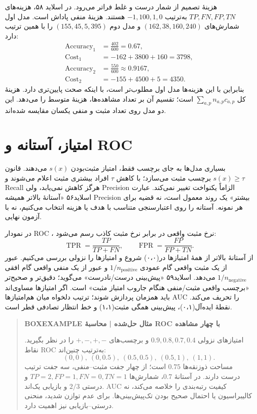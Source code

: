 هزینهٔ تصمیم از شمار درست و غلط فراتر می‌رود. در اسلاید ۵۸، هزینه‌های $TP,FN,FP,TN$ به‌ترتیب $-1,100,1,0$ هستند. هزینهٔ منفی پاداش است. مدل اول شمارش‌های $(162,38,160,240)$ و مدل دوم $(155,45,5,395)$ را با همین ترتیب دارد:
\begin{align*}
\operatorname{Accuracy}_1&=\frac{402}{600}=0.67,\\
\operatorname{Cost}_1&=-162+3800+160=3798,\\
\operatorname{Accuracy}_2&=\frac{550}{600}\approx0.9167,\\
\operatorname{Cost}_2&=-155+4500+5=4350.
\end{align*}
بنابراین با این هزینه‌ها مدل اول مطلوب‌تر است، با اینکه صحت پایین‌تری دارد. هزینهٔ کل $\sum_{a,p}n_{a,p}c_{a,p}$ است؛ تقسیم آن بر تعداد مشاهده‌ها، هزینهٔ متوسط را می‌دهد. این دو مدل روی تعداد مثبت و منفی یکسان مقایسه شده‌اند.

\section{امتیاز، آستانه و ROC}

بسیاری مدل‌ها به جای برچسب فقط، امتیاز مثبت‌بودن $s(x)$ می‌دهند. قانون $s(x)\ge\tau$ برچسب مثبت می‌سازد؛ با کاهش $\tau$ افراد بیشتری مثبت اعلام می‌شوند و Recall هرگز کاهش نمی‌یابد، ولی Precision الزاماً یکنواخت تغییر نمی‌کند. عبارت اسلاید۵۶ «آستانهٔ بالاتر همیشه Precision بیشتر» یک روند معمول است، نه قضیه برای هر نمونه. آستانه را روی اعتبارسنجی متناسب با هدف یا هزینه انتخاب می‌کنیم، نه با آزمون نهایی.

در نمودار ROC ، نرخ مثبت واقعی در برابر نرخ مثبت کاذب رسم می‌شود:\[\operatorname{TPR}=\frac{TP}{TP+FN},\qquad\operatorname{FPR}=\frac{FP}{FP+TN}.\] از آستانهٔ بالاتر از همهٔ امتیازها در(۰،۰) شروع و امتیازها را نزولی بررسی می‌کنیم. عبور از یک مثبت واقعی گام عمودی $1/n_{\mathrm{positive}}$ و عبور از یک منفی واقعی گام افقی $1/n_{\mathrm{negative}}$ می‌دهد. اسلاید۵۹ «پیش‌بینی درست/نادرست» می‌گوید؛ دقیق‌تر و صحیح‌تر «برچسب واقعی مثبت/منفی هنگام جاروب امتیاز مثبت» است. اگر امتیازها مساوی‌اند باید همزمان پردازش شوند؛ ترتیب دلخواه میان هم‌امتیازها AUC را تحریف می‌کند. نقطهٔ ایده‌آل(۰،۱)، پیش‌بینی همگی مثبت(۱،۱) و خط انتظار تصادفی قطر است.

\begin{quote}\textbf{BOXEXAMPLE مثال حل‌شده | محاسبهٔ ROC با چهار مشاهده}\par 
امتیازهای نزولی $0.9,0.8,0.7,0.4$ و برچسب‌های $+,-,+,-$ را در نظر بگیرید. نقاط ROC به‌ترتیب چنین‌اند:
\[(0,0),\ (0,0.5),\ (0.5,0.5),\ (0.5,1),\ (1,1).\]
مساحت ذوزنقه‌ها $0.75$ است؛ از چهار جفت مثبت–منفی، سه جفت ترتیب درست دارند. در آستانهٔ $0.7$، شمارش‌ها $TP=2,FP=1,FN=0,TN=1$ و درستی $2/3$ و بازیابی یک‌اند. AUC کیفیت رتبه‌بندی را خلاصه می‌کند، نه کالیبراسیون یا احتمال صحیح بودن تک‌پیش‌بینی‌ها. برای عدم توازن شدید، منحنی درستی–بازیابی نیز اهمیت دارد.
\end{quote}



